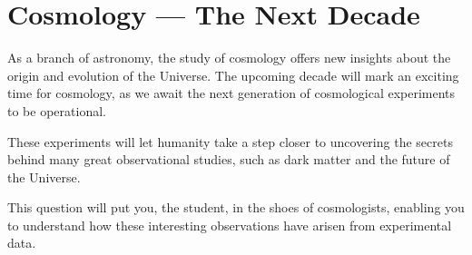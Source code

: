 \documentclass[a4paper,11pt,draft]{exam}
\begin{document}
\section{Cosmology --- The Next Decade}
As a branch of astronomy, the study of cosmology offers new insights about the origin and evolution of the Universe. The upcoming decade will mark an exciting time for cosmology, as we await the next generation of cosmological experiments to be operational. 

These experiments will let humanity take a step closer to uncovering the secrets behind many great observational studies, such as dark matter and the future of the Universe.

This question will put you, the student, in the shoes of cosmologists, enabling you to understand how these interesting observations have arisen from experimental data.
\end{document}
